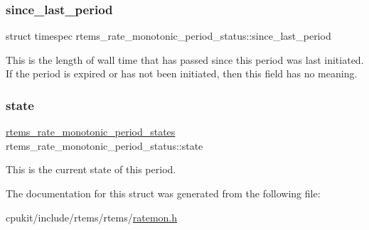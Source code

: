 \subsubsection{\texorpdfstring{since\_last\_period}{since\_last\_period}}
{\footnotesize\ttfamily struct timespec rtems\+\_\+rate\+\_\+monotonic\+\_\+period\+\_\+status\+::since\+\_\+last\+\_\+period}

This is the length of wall time that has passed since this period was last initiated. If the period is expired or has not been initiated, then this field has no meaning. \mbox{\label{structrtems__rate__monotonic__period__status_a6b196432be09cffb38d77cf8334c6f0c}} 
\subsubsection{\texorpdfstring{state}{state}}
{\footnotesize\ttfamily \mbox{\hyperlink{group__ClassicRateMon_ga0fd6fa9e7304b022e004061d542ca743}{rtems\+\_\+rate\+\_\+monotonic\+\_\+period\+\_\+states}} rtems\+\_\+rate\+\_\+monotonic\+\_\+period\+\_\+status\+::state}

This is the current state of this period. 

The documentation for this struct was generated from the following file\+:\begin{DoxyCompactItemize}
\item 
cpukit/include/rtems/rtems/\mbox{\hyperlink{ratemon_8h}{ratemon.\+h}}\end{DoxyCompactItemize}
